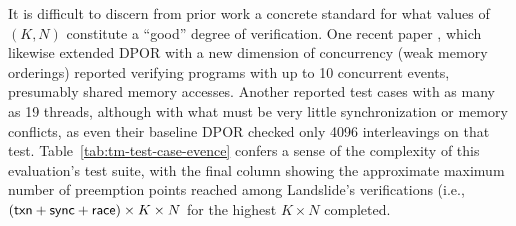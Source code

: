 It is difficult to discern from prior work a concrete standard
for what values of $(K, N)$ constitute a ``good'' degree of verification.
One recent paper \cite{tsopso},
which likewise extended DPOR with a new dimension of concurrency (weak memory orderings)
reported verifying programs with up to 10 concurrent events,
presumably shared memory accesses.
Another \cite{optimal-dpor}
reported test cases with as many as 19 threads,
although with what must be very little synchronization or memory conflicts,
as even their baseline DPOR checked only 4096 interleavings on that test.
%
Table~\ref{tab:tm-test-case-evence} confers a sense of the complexity of this evaluation's test suite,
with the final column showing the approximate maximum number of preemption points
reached among Landslide's verifications
(i.e., $({\sf txn}+{\sf sync}+{\sf race}) \times K \times N$ for the highest $K \times N$ completed.

